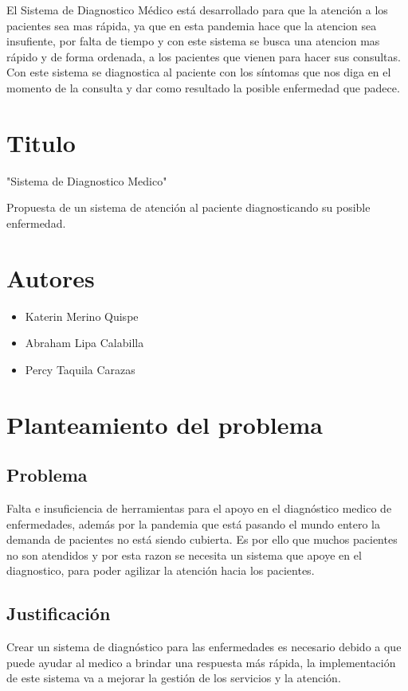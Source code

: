 \documentclass[preprint,12pt]{elsarticle}
\begin{document}
El Sistema de Diagnostico Médico está desarrollado para que la atención a los pacientes sea mas rápida, ya que en esta pandemia hace que la atencion sea insufiente, por falta de tiempo y con este sistema se busca una atencion mas rápido y de forma ordenada, a los pacientes que vienen para hacer sus consultas. Con este sistema se diagnostica al paciente con los síntomas que nos diga en el momento de la consulta y dar como resultado la posible enfermedad que padece.

\section{Titulo}
"Sistema de Diagnostico Medico"

Propuesta de un sistema de atención al paciente diagnosticando su posible enfermedad.
\section{Autores}
\begin{itemize}
    \item Katerin Merino Quispe
    \item Abraham Lipa Calabilla
    \item Percy Taquila Carazas
    
\end{itemize}
\section{Planteamiento del problema}
	\subsection{\textbf{Problema}}
Falta e insuficiencia de herramientas para el apoyo en el diagnóstico medico de enfermedades, además por la pandemia que está pasando el mundo entero la demanda de pacientes no está siendo cubierta. Es por ello que muchos pacientes no son atendidos y por esta razon se necesita un sistema que apoye en el diagnostico, para poder agilizar la atención hacia los pacientes.
	\subsection{\textbf{Justificación }}
Crear un sistema de diagnóstico para las enfermedades es necesario debido a que puede ayudar al medico a brindar una respuesta más rápida, la implementación de este sistema va a mejorar la gestión de los servicios y la atención.
\end{document}
